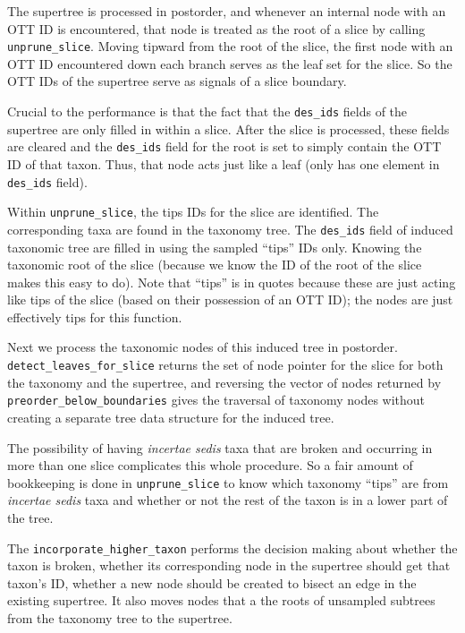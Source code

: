 \documentclass[english]{article}
\newcommand{\incsed}[0]{{\em incertae sedis}\xspace}
\begin{document}
The supertree is processed in postorder, and whenever an internal node with an OTT ID is
    encountered, that node is treated as the root of a slice by calling \texttt{unprune\_slice}.
Moving tipward from the root of the slice, the first node with an OTT ID encountered down
    each branch serves as the leaf set for the slice.
So the OTT IDs of the supertree serve as signals of a slice boundary.


Crucial to the performance is that the fact that the \texttt{des\_ids} fields of the supertree
    are only filled in within a slice. 
After the slice is processed, these fields are cleared and the \texttt{des\_ids} field
    for the root is set to simply contain the OTT ID of that taxon.
Thus, that node acts just like a leaf (only has one element in \texttt{des\_ids} field).


Within \texttt{unprune\_slice}, the tips IDs for the slice are identified.
The corresponding taxa are found in the taxonomy tree.
The \texttt{des\_ids} field of induced taxonomic tree are filled in using the sampled
    ``tips'' IDs only.
Knowing the taxonomic root of the slice (because we know the ID of the root of the
    slice makes this easy to do).
Note that ``tips'' is in quotes because these are just acting like tips of the slice
    (based on their possession of an OTT ID); the nodes are just effectively tips
    for this function.

Next we process the taxonomic nodes of this induced tree in postorder.
\texttt{detect\_leaves\_for\_slice} returns the set of node pointer for
    the slice for both the taxonomy and the supertree,
    and reversing the vector of nodes returned by 
    \texttt{preorder\_below\_boundaries} gives the traversal of taxonomy 
    nodes without creating a separate tree data structure for the induced tree.

The possibility of having \incsed taxa that are broken and occurring in more than
    one slice complicates this whole procedure.
So a fair amount of bookkeeping is done in \texttt{unprune\_slice} to 
    know which taxonomy ``tips'' are from \incsed taxa and whether or 
    not the rest of the taxon is in a lower part of the tree.

The \texttt{incorporate\_higher\_taxon} performs the decision making about whether
    the taxon is broken, whether its corresponding node in the supertree should
    get that taxon's ID, whether a new node should be created to bisect an edge in
    the existing supertree.
It also moves nodes that a the roots of unsampled subtrees from the taxonomy
    tree to the supertree.
\end{document}

